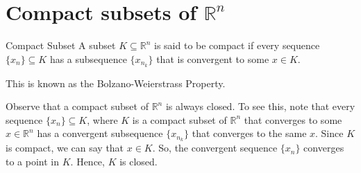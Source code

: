 \documentclass[a4paper]{article}
\begin{document}

\section{Compact subsets of $\mathbb{R}^n$}

\begin{Def}{Compact Subset}{}
    A subset $K \subseteq \mathbb{R}^n$ is said to be compact if every sequence $\{x_n\} \subseteq K$ has a subsequence $\{x_{n_k}\}$ that is convergent to some $x \in K$.
\end{Def}

This is known as the Bolzano-Weierstrass Property.

Observe that a compact subset of $\mathbb{R}^n$ is always closed. To see this, note that every sequence $\{x_n\} \subseteq K$, where $K$ is a compact subset of $\mathbb{R}^n$ that converges to some $x \in \mathbb{R}^n$ has a convergent subsequence $\{x_{n_k}\}$ that converges to the same $x$. Since $K$ is compact, we can say that $x \in K$. So, the convergent sequence $\{x_n\}$ converges to a point in $K$. Hence, $K$ is closed. 
\end{document}
